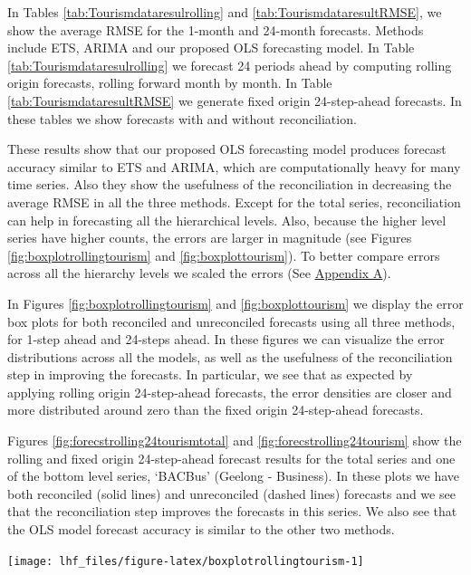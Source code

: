 \documentclass[11pt,a4paper,]{article}
\let\origfigure\figure
\let\endorigfigure\endfigure
\renewenvironment{figure}[1][2] {
    \expandafter\origfigure\expandafter[!htbp]
} {
    \endorigfigure
}
\begin{document}
In Tables \ref{tab:Tourismdataresulrolling} and
\ref{tab:TourismdataresultRMSE}, we show the average RMSE for the
1-month and 24-month forecasts. Methods include ETS, ARIMA and our
proposed OLS forecasting model. In Table
\ref{tab:Tourismdataresulrolling} we forecast 24 periods ahead by
computing rolling origin forecasts, rolling forward month by month. In
Table \ref{tab:TourismdataresultRMSE} we generate fixed origin
24-step-ahead forecasts. In these tables we show forecasts with and
without reconciliation.

These results show that our proposed OLS forecasting model produces
forecast accuracy similar to ETS and ARIMA, which are computationally
heavy for many time series. Also they show the usefulness of the
reconciliation in decreasing the average RMSE in all the three methods.
Except for the total series, reconciliation can help in forecasting all
the hierarchical levels. Also, because the higher level series have
higher counts, the errors are larger in magnitude (see Figures
\ref{fig:boxplotrollingtourism} and \ref{fig:boxplottourism}). To better
compare errors across all the hierarchy levels we scaled the errors (See
\protect\hyperlink{appendixA}{Appendix A}).

In Figures \ref{fig:boxplotrollingtourism} and \ref{fig:boxplottourism}
we display the error box plots for both reconciled and unreconciled
forecasts using all three methods, for 1-step ahead and 24-steps ahead.
In these figures we can visualize the error distributions across all the
models, as well as the usefulness of the reconciliation step in
improving the forecasts. In particular, we see that as expected by
applying rolling origin 24-step-ahead forecasts, the error densities are
closer and more distributed around zero than the fixed origin
24-step-ahead forecasts.

Figures \ref{fig:forecstrolling24tourismtotal} and
\ref{fig:forecstrolling24tourism} show the rolling and fixed origin
24-step-ahead forecast results for the total series and one of the
bottom level series, `BACBus' (Geelong - Business). In these plots we
have both reconciled (solid lines) and unreconciled (dashed lines)
forecasts and we see that the reconciliation step improves the forecasts
in this series. We also see that the OLS model forecast accuracy is
similar to the other two methods.

\begin{figure}

{\centering \texttt{[image: lhf\_files/figure-latex/boxplotrollingtourism-1]} 

}

\caption{Box plots of forecast errors from reconciled and unreconciled ETS, ARIMA and OLS methods at each hierarchical level for rolling origin 24-step-ahead tourism demand.}\label{fig:boxplotrollingtourism}
\end{figure}
\end{document}
